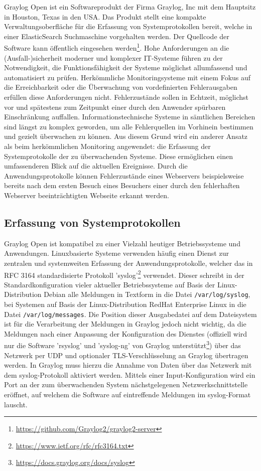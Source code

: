 Graylog Open ist ein Softwareprodukt der Firma Graylog, Inc mit dem Hauptsitz in Houston, Texas in den USA. Das Produkt stellt eine kompakte Verwaltungsoberfläche für die Erfassung von Systemprotokollen bereit, welche in einer ElasticSearch Suchmaschine vorgehalten werden. Der Quellcode der Software kann öffentlich eingesehen werden\footnote{\url{https://github.com/Graylog2/graylog2-server}}. Hohe Anforderungen an die (Ausfall-)sicherheit moderner und komplexer IT-Systeme führen zu der Notwendigkeit, die Funktionsfähigkeit der Systeme möglichst allumfassend und automatisiert zu prüfen. Herkömmliche Monitoringsysteme mit einem Fokus auf die Erreichbarkeit oder die Überwachung von vordefinierten Fehlerausgaben erfüllen diese Anforderungen nicht. Fehlerzustände sollen in Echtzeit, möglichst vor und spätestens zum Zeitpunkt einer durch den Anwender spürbaren Einschränkung auffallen. Informationstechnische Systeme in sämtlichen Bereichen sind längst zu komplex geworden, um alle Fehlerquellen im Vorhinein bestimmen und gezielt überwachen zu können. Aus diesem Grund wird ein anderer Ansatz als beim herkömmlichen Monitoring angewendet: die Erfassung der Systemprotokolle der zu überwachenden Systeme. Diese ermöglichen einen umfassenderen Blick auf die aktuellen Ereignisse. Durch die Anwendungsprotokolle können Fehlerzustände eines Webservers beispielsweise bereits nach dem ersten Besuch eines Besuchers einer durch den fehlerhaften Webserver beeinträchtigten Webseite erkannt werden.

\subsection{Erfassung von Systemprotokollen}

Graylog Open ist kompatibel zu einer Vielzahl heutiger Betriebssysteme und Anwendungen. Linuxbasierte Systeme verwenden häufig einen Dienst zur zentralen und systemweiten Erfassung der Anwendungsprotokolle, welcher das in RFC 3164 standardisierte Protokoll 'syslog'\footnote{\url{https://www.ietf.org/rfc/rfc3164.txt}} verwendet. Dieser schreibt in der Standardkonfiguration vieler aktueller Betriebssysteme auf Basis der Linux-Distribution Debian alle Meldungen in Textform in die Datei \lstinline{/var/log/syslog}, bei Systemen auf Basis der Linux-Distribution RedHat Enterprise Linux in die Datei \lstinline{/var/log/messages}. Die Position dieser Ausgabedatei auf dem Dateisystem ist für die Verarbeitung der Meldungen in Graylog jedoch nicht wichtig, da die Meldungen nach einer Anpassung der Konfiguration des Dienstes (offiziell wird nur die Software 'rsyslog' und 'syslog-ng' von Graylog unterstützt\footnote{\url{https://docs.graylog.org/docs/syslog}}) über das Netzwerk per UDP und optionaler TLS-Verschlüsselung an Graylog übertragen werden. In Graylog muss hierzu die Annahme von Daten über das Netzwerk mit dem syslog-Protokoll aktiviert werden. Mittels einer Input-Konfiguration wird ein Port an der zum überwachenden System nächstgelegenen Netzwerkschnittstelle eröffnet, auf welchem die Software auf eintreffende Meldungen im syslog-Format lauscht.

